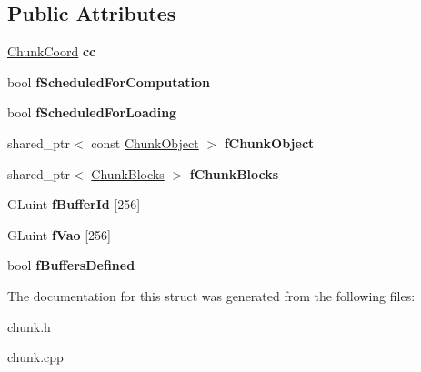 \subsection*{\-Public \-Attributes}
\begin{DoxyCompactItemize}
\item 
\hypertarget{structchunk_a068473314f595f8880f77b26a85e4543}{\hyperlink{structChunkCoord}{\-Chunk\-Coord} {\bfseries cc}}\label{structchunk_a068473314f595f8880f77b26a85e4543}

\item 
\hypertarget{structchunk_a2f3d6db89375f2c2247d34e999aaeb88}{bool {\bfseries f\-Scheduled\-For\-Computation}}\label{structchunk_a2f3d6db89375f2c2247d34e999aaeb88}

\item 
\hypertarget{structchunk_a9e196a8124a44f42d5499d04c1e3ac5b}{bool {\bfseries f\-Scheduled\-For\-Loading}}\label{structchunk_a9e196a8124a44f42d5499d04c1e3ac5b}

\item 
\hypertarget{structchunk_acea161822a608ba9e4cee340e50478d8}{shared\-\_\-ptr$<$ const \hyperlink{classChunkObject}{\-Chunk\-Object} $>$ {\bfseries f\-Chunk\-Object}}\label{structchunk_acea161822a608ba9e4cee340e50478d8}

\item 
\hypertarget{structchunk_aaf36406c10070a5fdc5508a100f6d3a7}{shared\-\_\-ptr$<$ \hyperlink{structChunkBlocks}{\-Chunk\-Blocks} $>$ {\bfseries f\-Chunk\-Blocks}}\label{structchunk_aaf36406c10070a5fdc5508a100f6d3a7}

\item 
\hypertarget{structchunk_a27a8b1efa7f3ddc6f1df8c2a789bc109}{\-G\-Luint {\bfseries f\-Buffer\-Id} \mbox{[}256\mbox{]}}\label{structchunk_a27a8b1efa7f3ddc6f1df8c2a789bc109}

\item 
\hypertarget{structchunk_adfc36fb66a3442bf328f9d1bb94d19c3}{\-G\-Luint {\bfseries f\-Vao} \mbox{[}256\mbox{]}}\label{structchunk_adfc36fb66a3442bf328f9d1bb94d19c3}

\item 
\hypertarget{structchunk_ac254adeb6ad5c60c740d2aa30bbc76fd}{bool {\bfseries f\-Buffers\-Defined}}\label{structchunk_ac254adeb6ad5c60c740d2aa30bbc76fd}

\end{DoxyCompactItemize}


\-The documentation for this struct was generated from the following files\-:\begin{DoxyCompactItemize}
\item 
chunk.\-h\item 
chunk.\-cpp\end{DoxyCompactItemize}
